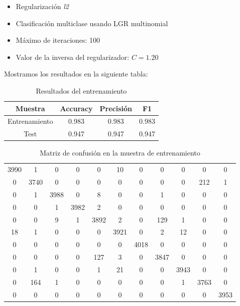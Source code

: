 \documentclass[11pt]{article}
\begin{document}
\begin{itemize}
    \item Regularización \emph{l2}
    \item Clasificación multiclase usando LGR multinomial
    \item Máximo de iteraciones: 100
    \item Valor de la inversa del regularizador: $C = 1.20$
\end{itemize}

Mostramos los resultados en la siguiente tabla:

\begin{table}[H]
\centering
\begin{tabular}{|c|c|c|c|}
    \hline
    \textbf{Muestra} & \textbf{Accuracy} & \textbf{Precisión} & \textbf{F1} \\
    \hline
    Entrenamiento & 0.983 & 0.983 & 0.983 \\
    Test & 0.947 & 0.947 & 0.947 \\
    \hline

\end{tabular}
    \caption{Resultados del entrenamiento}
\end{table}

\begin{table}[H]
\centering
    \begin{tabular}{|c|c|c|c|c|c|c|c|c|c|c|}
    \hline
3990 &    1 &    0 &    0 &    0 &   10 &    0 &    0 &     0 &    0 &    0 \\
   0& 3740&    0&    0&    0&    0&    0&    0&    0&  212&    1 \\
   0&    1& 3988&    0&    8&    0&    0&    1&    0&    0&    0 \\
   0&    0&    1& 3982&    2&    0&    0&    0&    0&    0&    0 \\
   0&    0&    9&    1& 3892&    2&    0&  129&    1&    0&    0 \\
  18&    1&    0&    0&    0& 3921&    0&    2&   12&    0&    0 \\
   0&    0&    0&    0&    0&    0& 4018&    0&    0&    0&    0 \\
   0&    0&    0&    0&  127&    3&    0& 3847&    0&    0&    0 \\
   0&    1&    0&    0&    1&   21&    0&    0& 3943&    0&    0 \\
   0&  164&    1&    0&    0&    0&    0&    0&    1& 3763&    0 \\
   0&    0&    0&    0&    0&    0&    0&    0&    0&    0& 3953 \\
   \hline
\end{tabular}
\caption{Matriz de confusión en la muestra de entrenamiento}
\end{table}
\end{document}

